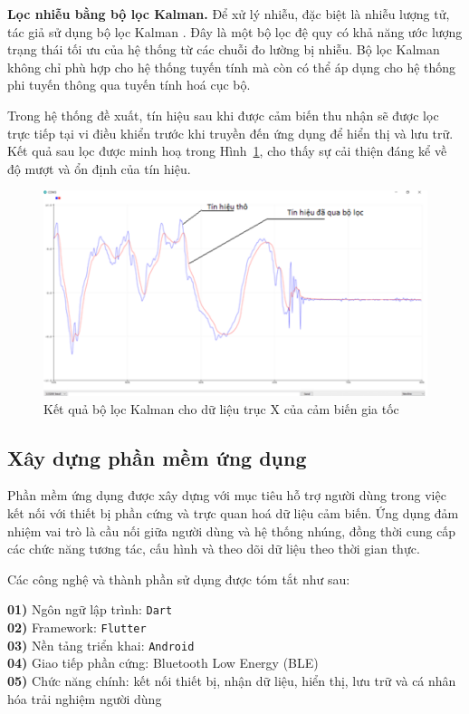 \textbf{Lọc nhiễu bằng bộ lọc Kalman.} Để xử lý nhiễu, đặc biệt là nhiễu 
lượng tử, tác giả sử dụng bộ lọc Kalman \cite{kalman}. Đây là một bộ lọc 
đệ quy có khả năng ước lượng trạng thái tối ưu của hệ thống từ các chuỗi 
đo lường bị nhiễu. Bộ lọc Kalman không chỉ phù hợp cho hệ thống tuyến 
tính mà còn có thể áp dụng cho hệ thống phi tuyến thông qua tuyến tính 
hoá cục bộ.

Trong hệ thống đề xuất, tín hiệu sau khi được cảm biến thu nhận sẽ 
được lọc trực tiếp tại vi điều khiển trước khi truyền đến ứng dụng 
để hiển thị và lưu trữ. Kết quả sau lọc được minh hoạ trong 
Hình~\ref{kalman}, cho thấy sự cải thiện đáng kể về độ mượt và ổn 
định của tín hiệu.


\begin{figure}[htbp]
    \centering
    \includegraphics[width=\textwidth]{images/kalman.png}
    \caption{Kết quả bộ lọc Kalman cho dữ liệu trục X của cảm biến gia tốc}
    \label{kalman}
\end{figure}





\subsection{Xây dựng phần mềm ứng dụng}

Phần mềm ứng dụng được xây dựng với mục tiêu hỗ trợ người dùng trong việc 
kết nối với thiết bị phần cứng và trực quan hoá dữ liệu cảm biến. 
Ứng dụng đảm nhiệm vai trò là cầu nối giữa người dùng và hệ thống nhúng, 
đồng thời cung cấp các chức năng tương tác, cấu hình và theo dõi dữ liệu 
theo thời gian thực.

Các công nghệ và thành phần sử dụng được tóm tắt như sau:

\begin{flushleft}
\textbf{01)} Ngôn ngữ lập trình: \texttt{Dart} \\
\textbf{02)} Framework: \texttt{Flutter} \\
\textbf{03)} Nền tảng triển khai: \texttt{Android} \\
\textbf{04)} Giao tiếp phần cứng: Bluetooth Low Energy (BLE) \\
\textbf{05)} Chức năng chính: kết nối thiết bị, nhận dữ liệu, hiển thị, lưu trữ và cá nhân hóa trải nghiệm người dùng
\end{flushleft}

